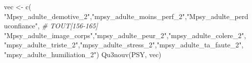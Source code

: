 \documentclass[
]{article}
\newenvironment{Shaded}{\begin{snugshade}}{\end{snugshade}}
\newcommand{\CommentTok}[1]{\textcolor[rgb]{0.56,0.35,0.01}{\textit{#1}}}
\newcommand{\FunctionTok}[1]{\textcolor[rgb]{0.00,0.00,0.00}{#1}}
\newcommand{\NormalTok}[1]{#1}
\newcommand{\OtherTok}[1]{\textcolor[rgb]{0.56,0.35,0.01}{#1}}
\newcommand{\StringTok}[1]{\textcolor[rgb]{0.31,0.60,0.02}{#1}}
\begin{document}
\begin{Shaded}
\begin{Highlighting}[]
\NormalTok{vec }\OtherTok{\textless{}{-}} \FunctionTok{c}\NormalTok{( }\StringTok{"Mpsy\_adulte\_demotive\_2"}\NormalTok{,}\StringTok{"mpsy\_adulte\_moins\_perf\_2"}\NormalTok{,}\StringTok{"Mpsy\_adulte\_perduconfiance"}\NormalTok{,   }\CommentTok{\# TOUT[156{-}165]}
     \StringTok{"Mpsy\_adulte\_image\_corps"}\NormalTok{,}\StringTok{"mpsy\_adulte\_peur\_2"}\NormalTok{,}\StringTok{"mpsy\_adulte\_colere\_2"}\NormalTok{,}
     \StringTok{"mpsy\_adulte\_triste\_2"}\NormalTok{,}\StringTok{"mpsy\_adulte\_stress\_2"}\NormalTok{,}\StringTok{"mpsy\_adulte\_ta\_faute\_2"}\NormalTok{,}
     \StringTok{"mpsy\_adulte\_humiliation\_2"}\NormalTok{)}
\FunctionTok{Qu3nouv}\NormalTok{(PSY, vec)}
\end{Highlighting}
\end{Shaded}
\end{document}
